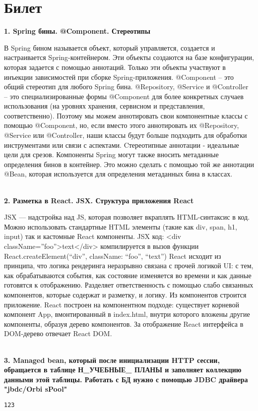 \documentclass{article}
\newcommand{\bil}[5]{%
        \section{Билет}
        \textbf{1. #1}

        #4
        \\
        \textbf{2. #2}
        
        #5
        \\
        \textbf{3. #3}
}
\begin{document}
\bil{Spring бины. @Component. Стереотипы}
{Разметка в React. JSX. Структура приложения React}
{Managed bean, который после инициализации HTTP сессии, обращается в таблице Н\_УЧЕБНЫЕ\_ ПЛАНЫ и заполняет коллекцию данными этой таблицы. Работать с БД нужно с помощью JDBC драйвера "jbdc/Orbi sPool"}{
    В Spring бином называется объект, который управляется, создается и настраивается Spring-контейнером. 
    Эти объекты создаются на базе конфигурации, которая задается с помощью аннотаций. 
    Только эти объекты участвуют в инъекции зависимостей при сборке Spring-приложения.
    @Component – это общий стереотип для любого Spring бина. @Repository, @Service и @Controller – это специализированные формы @Component для более конкретных случаев использования (на уровнях хранения, сервисном и представления, соответственно). 
    Поэтому мы можем аннотировать свои компонентные классы с помощью @Component, но, если вместо этого аннотировать их @Repository, @Service или @Controller, наши классы будут больше подходить для обработки инструментами или связи с аспектами. 
    Cтереотипные аннотации - идеальные цели для срезов.
    Компоненты Spring могут также вносить метаданные определения бинов в контейнер. 
    Это можно сделать с помощью той же аннотации @Bean, которая используется для определения метаданных бина в классах.
}{
    JSX — надстройка над JS, которая позволяет вкраплять HTML-синтаксис в код. 
    Можно использовать стандартные HTML элементы (такие как div, span, h1, input) так и кастомные React компоненты. 
    JSX код: <div className=”foo”>text</div> компилируется в вызов функции React.createElement(“div”, className: “foo”, “text”)
    React исходит из принципа, что логика рендеринга неразрывно связана с прочей логикой UI: с тем, как обрабатываются события, как состояние изменяется во времени и как данные готовятся к отображению.
    Разделяет ответственность с помощью слабо связанных компонентов, которые содержат и разметку, и логику. Из компонентов строится приложение. 
    React построен на компонентном подходе: существует корневой компонент App, вмонтированный в index.html, внутри которого вложены другие компоненты, образуя дерево компонентов. 
    За отображение React интерфейса в DOM-дерево отвечает React DOM.
}
\begin{lstlisting}[frame=single, basicstyle=\ttfamily, breaklines=true, breakatwhitespace=true, postbreak=\mbox{\textcolor{red}{$\hookrightarrow$}\space}]
123
\end{lstlisting}
\end{document}
